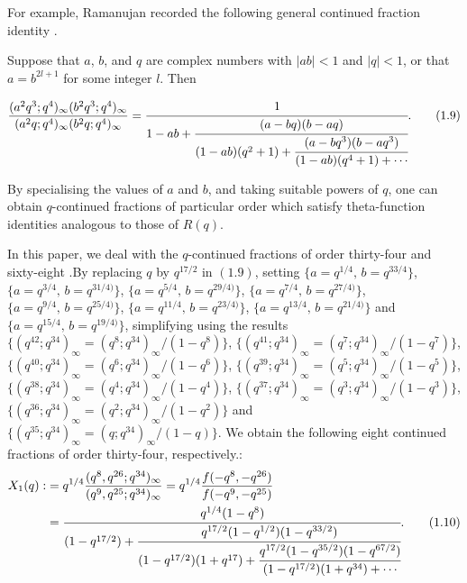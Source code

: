 \documentclass[11pt,a4paper]{article}
\numberwithin{equation}{section}
\theoremstyle{plain}
\begin{document}
	For example, Ramanujan recorded the following general continued fraction 
	identity \cite[p.~24, Entry~12]{Berndt}.
	
	Suppose that $a$, $b$, and $q$ are complex numbers with $|ab|<1$ and $|q|<1$, 
	or that $a=b^{2l+1}$ for some integer $l$. Then
	
	\begin{equation}
		\frac{(a^{2}q^{3};q^{4})_{\infty}(b^{2}q^{3};q^{4})_{\infty}}
		{(a^{2}q;q^{4})_{\infty}(b^{2}q;q^{4})_{\infty}}
		=
		\cfrac{1}{1-ab+
			\cfrac{(a-bq)(b-aq)}
			{(1-ab)(q^{2}+1)+
				\cfrac{(a-bq^{3})(b-aq^{3})}
				{(1-ab)(q^{4}+1)+\cdots}}
		}.
		\tag{1.9}
	\end{equation}
	
	By specialising the values of $a$ and $b$, and taking suitable powers of $q$, 
	one can obtain $q$-continued fractions of particular order which satisfy 
	theta-function identities analogous to those of $R(q)$.
    
    In this paper, we deal with the $q$-continued fractions of order thirty-four and sixty-eight .By replacing $q$ by $q^{17/2}$ in ${(1.9)}$, setting 
	$\{a=q^{1/4},\, b=q^{33/4}\}$, $\{a=q^{3/4},\, b=q^{31/4)}\}$, $\{a=q^{5/4},\, b=q^{29/4)}\}$, $\{a=q^{7/4},\, b=q^{27/4)}\}$, $\{a=q^{9/4},\, b=q^{25/4)}\}$, $\{a=q^{11/4},\, b=q^{23/4)}\}$, $\{a=q^{13/4},\, b=q^{21/4)}\}$ and $\{a=q^{15/4},\, b=q^{19/4)}\}$, simplifying using the results
$\{(q^{42};q^{34})_{\infty} = (q^{8};q^{34})_{\infty}/(1-q^{8})\}$, 
$\{(q^{41};q^{34})_{\infty} = (q^{7};q^{34})_{\infty}/(1-q^{7})\}$, 
$\{(q^{40};q^{34})_{\infty} = (q^{6};q^{34})_{\infty}/(1-q^{6})\}$, 
$\{(q^{39};q^{34})_{\infty} = (q^{5};q^{34})_{\infty}/(1-q^{5})\}$, 
$\{(q^{38};q^{34})_{\infty} = (q^{4};q^{34})_{\infty}/(1-q^{4})\}$, 
$\{(q^{37};q^{34})_{\infty} = (q^{3};q^{34})_{\infty}/(1-q^{3})\}$, 
$\{(q^{36};q^{34})_{\infty} = (q^{2};q^{34})_{\infty}/(1-q^{2})\}$
and
$\{(q^{35};q^{34})_{\infty} = (q;q^{34})_{\infty}/(1-q)\}$.
We obtain the following eight continued fractions of order thirty-four, respectively.:
	\begin{align}
		X_1(q) :&= q^{1/4}\frac{(q^{8},q^{26};q^{34})_{\infty}}{(q^{9},q^{25};q^{34})_{\infty}}
		= q^{1/4}\frac{f(-q^{8},-q^{26})}{f(-q^{9},-q^{25})}  \notag\\
		&=
		\cfrac{q^{1/4}(1-q^{8})}
		{(1-q^{17/2})
			+\cfrac{q^{17/2}(1-q^{1/2})(1-q^{33/2})}
			{(1-q^{17/2})(1+q^{17})
				+\cfrac{q^{17/2}(1-q^{35/2})(1-q^{67/2})}
				{(1-q^{17/2})(1+q^{34})+\cdots}}}.
		\tag{1.10}
	\end{align}
	
\end{document}
